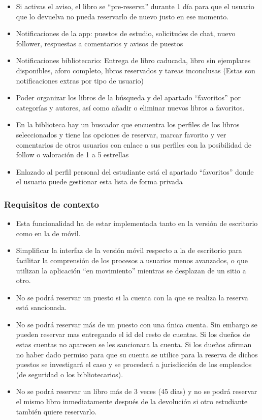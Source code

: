 \documentclass[12pt]{article}
\begin{document}
\begin{itemize}[noitemsep]
\item Si activas el aviso, el libro se “pre-reserva” durante 1 día para que el usuario que lo devuelva no pueda reservarlo de nuevo justo en ese momento.
\item Notificaciones de la app: puestos de estudio, solicitudes de chat, nuevo follower, respuestas a comentarios y avisos de puestos
\item Notificaciones bibliotecario: Entrega de libro caducada, libro sin ejemplares disponibles, aforo completo, libros reservados y tareas inconclusas (Estas son notificaciones extras por tipo de usuario)
\item Poder organizar los libros de la búsqueda y del apartado “favoritos” por categorías y autores, así como añadir o eliminar nuevos libros a favoritos.
\item En la biblioteca hay un buscador que encuentra los perfiles de los libros seleccionados y  tiene las opciones de reservar, marcar favorito y ver comentarios de otros usuarios con enlace a sus perfiles con la posibilidad de follow o valoración de 1 a 5 estrellas
\item Enlazado al perfil personal del estudiante está el apartado “favoritos” donde el usuario puede gestionar esta lista de forma privada
\end{itemize}

\subsubsection{Requisitos de contexto}
\begin{itemize}[noitemsep]
\item Esta funcionalidad ha de estar implementada tanto en la versión de escritorio como en la de móvil.
\item Simplificar la interfaz de la versión móvil respecto a la de escritorio para facilitar la comprensión de los procesos a usuarios menos avanzados, o que utilizan la aplicación “en movimiento” mientras se desplazan de un sitio a otro.
\item No se podrá reservar un puesto si la cuenta con la que se realiza la reserva está sancionada.
\item No se podrá reservar más de un puesto con una única cuenta. Sin embargo se pueden reservar mas entregando el id del resto de cuentas. Si los dueños de estas cuentas no aparecen se les sancionara la cuenta. Si los dueños afirman no haber dado permiso para que su cuenta se utilice para la reserva de dichos puestos se investigará el caso y se procederá a jurisdicción de los empleados (de seguridad o los bibliotecarios).
\item No se podrá reservar un libro más de 3 veces (45 días) y no se podrá reservar el mismo libro inmediatamente después de la devolución si otro estudiante también quiere reservarlo.
\end{itemize}
\end{document}
